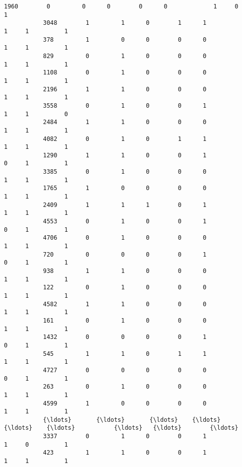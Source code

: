 \documentclass[11pt]{article}
\begin{document}
\begin{Verbatim}[commandchars=\\\{\}]
           1960        0         0      0        0      0             1     0          1   
           3048        1         1      0        1      1             1     1          1   
           378         1         0      0        0      0             1     1          1   
           829         0         1      0        0      0             1     1          1   
           1108        0         1      0        0      0             1     1          1   
           2196        1         1      0        0      0             1     1          1   
           3558        0         1      0        0      1             1     1          0   
           2484        1         1      0        0      0             1     1          1   
           4082        0         1      0        1      1             1     1          1   
           1290        1         1      0        0      1             0     1          1   
           3385        0         1      0        0      0             1     1          1   
           1765        1         0      0        0      0             1     1          1   
           2409        1         1      1        0      1             1     1          1   
           4553        0         1      0        0      1             0     1          1   
           4706        0         1      0        0      0             1     1          1   
           720         0         0      0        0      1             0     1          1   
           938         1         1      0        0      0             1     1          1   
           122         0         1      0        0      0             1     1          1   
           4582        1         1      0        0      0             1     1          1   
           161         0         1      0        0      0             1     1          1   
           1432        0         0      0        0      1             0     1          1   
           545         1         1      0        1      1             1     1          1   
           4727        0         0      0        0      0             0     1          1   
           263         0         1      0        0      0             1     1          1   
           4599        1         0      0        0      0             1     1          1   
           {\ldots}       {\ldots}       {\ldots}    {\ldots}      {\ldots}    {\ldots}           {\ldots}   {\ldots}        {\ldots}   
           3337        0         1      0        0      1             1     0          1   
           423         1         1      0        0      1             1     1          1   

\end{Verbatim}
\end{document}
